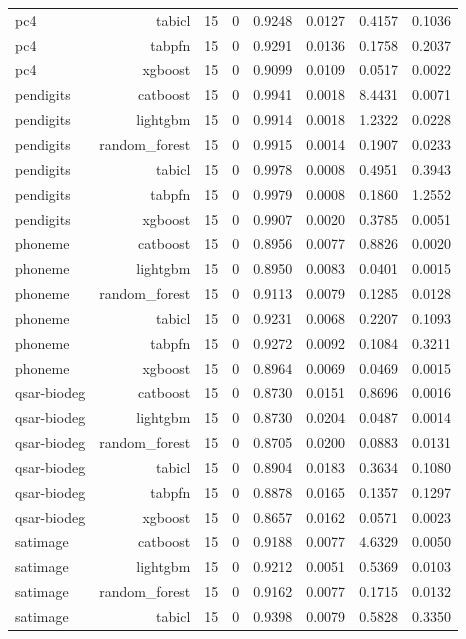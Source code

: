 \begin{table}[htbp]
\begin{tabular}{lrrrrrrr}
pc4 & tabicl & 15 & 0 & 0.9248 & 0.0127 & 0.4157 & 0.1036 \\
pc4 & tabpfn & 15 & 0 & 0.9291 & 0.0136 & 0.1758 & 0.2037 \\
pc4 & xgboost & 15 & 0 & 0.9099 & 0.0109 & 0.0517 & 0.0022 \\
pendigits & catboost & 15 & 0 & 0.9941 & 0.0018 & 8.4431 & 0.0071 \\
pendigits & lightgbm & 15 & 0 & 0.9914 & 0.0018 & 1.2322 & 0.0228 \\
pendigits & random\_forest & 15 & 0 & 0.9915 & 0.0014 & 0.1907 & 0.0233 \\
pendigits & tabicl & 15 & 0 & 0.9978 & 0.0008 & 0.4951 & 0.3943 \\
pendigits & tabpfn & 15 & 0 & 0.9979 & 0.0008 & 0.1860 & 1.2552 \\
pendigits & xgboost & 15 & 0 & 0.9907 & 0.0020 & 0.3785 & 0.0051 \\
phoneme & catboost & 15 & 0 & 0.8956 & 0.0077 & 0.8826 & 0.0020 \\
phoneme & lightgbm & 15 & 0 & 0.8950 & 0.0083 & 0.0401 & 0.0015 \\
phoneme & random\_forest & 15 & 0 & 0.9113 & 0.0079 & 0.1285 & 0.0128 \\
phoneme & tabicl & 15 & 0 & 0.9231 & 0.0068 & 0.2207 & 0.1093 \\
phoneme & tabpfn & 15 & 0 & 0.9272 & 0.0092 & 0.1084 & 0.3211 \\
phoneme & xgboost & 15 & 0 & 0.8964 & 0.0069 & 0.0469 & 0.0015 \\
qsar-biodeg & catboost & 15 & 0 & 0.8730 & 0.0151 & 0.8696 & 0.0016 \\
qsar-biodeg & lightgbm & 15 & 0 & 0.8730 & 0.0204 & 0.0487 & 0.0014 \\
qsar-biodeg & random\_forest & 15 & 0 & 0.8705 & 0.0200 & 0.0883 & 0.0131 \\
qsar-biodeg & tabicl & 15 & 0 & 0.8904 & 0.0183 & 0.3634 & 0.1080 \\
qsar-biodeg & tabpfn & 15 & 0 & 0.8878 & 0.0165 & 0.1357 & 0.1297 \\
qsar-biodeg & xgboost & 15 & 0 & 0.8657 & 0.0162 & 0.0571 & 0.0023 \\
satimage & catboost & 15 & 0 & 0.9188 & 0.0077 & 4.6329 & 0.0050 \\
satimage & lightgbm & 15 & 0 & 0.9212 & 0.0051 & 0.5369 & 0.0103 \\
satimage & random\_forest & 15 & 0 & 0.9162 & 0.0077 & 0.1715 & 0.0132 \\
satimage & tabicl & 15 & 0 & 0.9398 & 0.0079 & 0.5828 & 0.3350 \\

\end{tabular}
\end{table}
